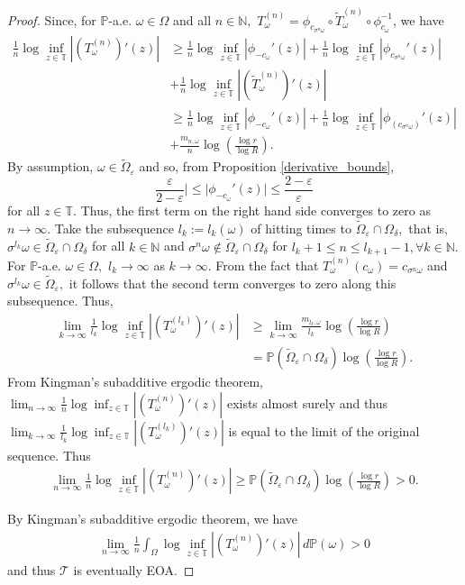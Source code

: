 \documentclass[12pt,reqno]{amsart}
\numberwithin{theorem}{section}
\begin{document}
\begin{proof}
      Since, for $\mathbb{P}$-a.e. $\omega\in\Omega$ and all $n\in\mathbb{N},$ $T_{\omega}^{(n)}=\phi_{c_{\sigma^{n}\omega}}\circ \tilde{T}_{\omega}^{(n)}\circ\phi_{c_{\omega}}^{-1}$, we have \begin{align*}
        \frac{1}{n}\log\inf_{z\in\mathbb{T}}|(T_{\omega}^{(n)})'(z)|&\ge\frac{1}{n}\log\inf_{z\in\mathbb{T}}|\phi_{-c_{\omega}}'(z)|+\frac{1}{n}\log\inf_{z\in\mathbb{T}}|\phi_{c_{\sigma^{n}\omega}}'(z)|\\&+\frac{1}{n}\log\inf_{z\in\mathbb{T}}|(\tilde{T}_{\omega}^{(n)})'(z)|\\&\ge\frac{1}{n}\log\inf_{z\in\mathbb{T}}|\phi_{-c_{\omega}}'(z)|+\frac{1}{n}\log\inf_{z\in\mathbb{T}}|\phi_{(c_{\sigma^{n}\omega})}'(z)|\\&+\frac{m_{n,\omega}}{n}\log\left(\frac{\log r}{\log R}\right).
    \end{align*} By assumption, $\omega\in\tilde{\Omega}_{\varepsilon}$ and so, from Proposition \ref{derivative_bounds}, $$\frac{\varepsilon}{2-\varepsilon}|\le|\phi_{-c_{\omega}}'(z)|\le\frac{2-\varepsilon}{\varepsilon}$$ for all $z\in\mathbb{T}.$ Thus, the first term on the right hand side converges to zero as $n\to\infty$. Take the subsequence $l_k:=l_k(\omega)$ of hitting times to $\tilde{\Omega}_{\varepsilon}\cap\Omega_{\delta},$ that is, $\sigma^{l_{k}}\omega\in\tilde{\Omega}_{\varepsilon}\cap\Omega_{\delta}$ for all $k\in\mathbb{N}$ and $\sigma^{n}\omega\not\in \tilde{\Omega}_{\varepsilon}\cap\Omega_{\delta}$ for $l_{k}+1\le n\le l_{k+1}-1, \forall k\in\mathbb{N}.$ For $\mathbb{P}$-a.e. $\omega\in\Omega,$ $l_k\to\infty$ as $k\to\infty.$ From the fact that $T_{\omega}^{(n)}(c_{\omega})=c_{\sigma^{n}\omega}$ and $\sigma^{l_k}\omega\in\tilde{\Omega}_{\varepsilon},$  it follows that the second term converges to zero along this subsequence. Thus,  \begin{align*}\lim_{k\to\infty}\frac{1}{l_k}\log\inf_{z\in\mathbb{T}}|(T_{\omega}^{(l_k)})'(z)|&\ge\lim_{k\to\infty}\frac{m_{l_k,\omega}}{l_k}\log\left(\frac{\log r}{\log R}\right)\\&=\mathbb{P}(\tilde{\Omega}_{\varepsilon}\cap\Omega_{\delta})\log\left(\frac{\log r}{\log R}\right).\end{align*} 
    From Kingman's subadditive ergodic theorem, $\lim_{n\to\infty}\frac{1}{n}\log\inf_{z\in\mathbb{T}}|(T_{\omega}^{(n)})'(z)|$ exists almost surely and thus $\lim_{k\to\infty}\frac{1}{l_k}\log\inf_{z\in\mathbb{T}}|(T_{\omega}^{(l_k)})'(z)|$ is equal to the limit of the original sequence. Thus \begin{align*}
         \lim_{n\to\infty}\frac{1}{n}\log\inf_{z\in\mathbb{T}}|(T_{\omega}^{(n)})'(z)|\ge\mathbb{P}(\tilde{\Omega}_{\varepsilon}\cap\Omega_{\delta})\log\left(\frac{\log r}{\log R}\right)>0.
    \end{align*} 
    
    
    By Kingman's subadditive ergodic theorem, we have \begin{align*}\lim_{n\to\infty}\frac{1}{n}\int_{\Omega}\log\inf_{z\in\mathbb{T}}|(T_{\omega}^{(n)})'(z)|\,d\mathbb{P}(\omega)>0\end{align*} and thus $\mathcal{T}$ is eventually EOA. 
    
\end{proof}
\end{document}
